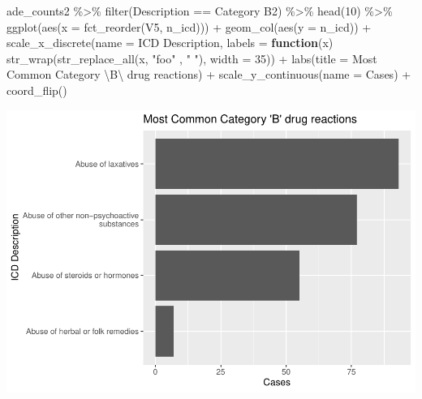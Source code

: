 \documentclass[preprint, 3p,
authoryear]{elsarticle} %
\newenvironment{Shaded}{\begin{snugshade}}{\end{snugshade}}
\newcommand{\AttributeTok}[1]{\textcolor[rgb]{0.77,0.63,0.00}{#1}}
\newcommand{\ControlFlowTok}[1]{\textcolor[rgb]{0.13,0.29,0.53}{\textbf{#1}}}
\newcommand{\DecValTok}[1]{\textcolor[rgb]{0.00,0.00,0.81}{#1}}
\newcommand{\FunctionTok}[1]{\textcolor[rgb]{0.00,0.00,0.00}{#1}}
\newcommand{\NormalTok}[1]{#1}
\newcommand{\SpecialCharTok}[1]{\textcolor[rgb]{0.00,0.00,0.00}{#1}}
\newcommand{\StringTok}[1]{\textcolor[rgb]{0.31,0.60,0.02}{#1}}
\begin{document}
\begin{Shaded}
\begin{Highlighting}[]
\NormalTok{ade\_counts2 }\SpecialCharTok{\%\textgreater{}\%}
  \FunctionTok{filter}\NormalTok{(Description }\SpecialCharTok{==} \StringTok{\textquotesingle{}Category B2\textquotesingle{}}\NormalTok{) }\SpecialCharTok{\%\textgreater{}\%}
  \FunctionTok{head}\NormalTok{(}\DecValTok{10}\NormalTok{) }\SpecialCharTok{\%\textgreater{}\%}
  \FunctionTok{ggplot}\NormalTok{(}\FunctionTok{aes}\NormalTok{(}\AttributeTok{x =} \FunctionTok{fct\_reorder}\NormalTok{(V5, n\_icd))) }\SpecialCharTok{+}
  \FunctionTok{geom\_col}\NormalTok{(}\FunctionTok{aes}\NormalTok{(}\AttributeTok{y =}\NormalTok{ n\_icd)) }\SpecialCharTok{+} 
  \FunctionTok{scale\_x\_discrete}\NormalTok{(}\AttributeTok{name =} \StringTok{\textquotesingle{}ICD Description\textquotesingle{}}\NormalTok{, }\AttributeTok{labels =} \ControlFlowTok{function}\NormalTok{(x) }\FunctionTok{str\_wrap}\NormalTok{(}\FunctionTok{str\_replace\_all}\NormalTok{(x, }\StringTok{"foo"}\NormalTok{ , }\StringTok{" "}\NormalTok{),}
                                                 \AttributeTok{width =} \DecValTok{35}\NormalTok{)) }\SpecialCharTok{+}
  \FunctionTok{labs}\NormalTok{(}\AttributeTok{title =} \StringTok{\textquotesingle{}Most Common Category }\SpecialCharTok{\textbackslash{}\textquotesingle{}}\StringTok{B}\SpecialCharTok{\textbackslash{}\textquotesingle{}}\StringTok{ drug reactions\textquotesingle{}}\NormalTok{) }\SpecialCharTok{+}
  \FunctionTok{scale\_y\_continuous}\NormalTok{(}\AttributeTok{name =} \StringTok{\textquotesingle{}Cases\textquotesingle{}}\NormalTok{) }\SpecialCharTok{+}
  \FunctionTok{coord\_flip}\NormalTok{() }
\end{Highlighting}
\end{Shaded}

\includegraphics{final-project-paper_files/figure-latex/ade-cat-B-1.pdf}
\end{document}
